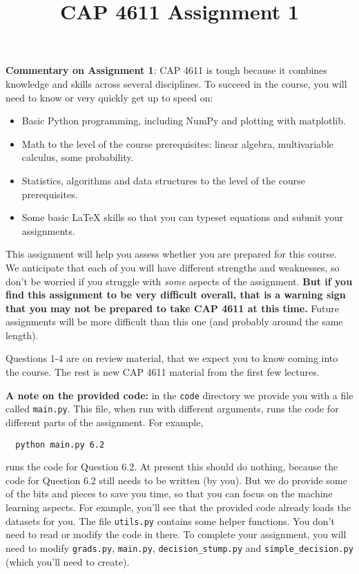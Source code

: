 \documentclass{article}
\begin{document}
  \title{CAP 4611 Assignment 1}

  \date{}
  \maketitle


  \textbf{Commentary on Assignment 1}: CAP 4611 is tough because it combines knowledge and skills across several disciplines. To succeed
  in the course, you will need to know or very quickly get up to speed on:
  \begin{itemize}
  \item Basic Python programming, including NumPy and plotting with matplotlib.
  \item Math to the level of the course prerequisites: linear algebra, multivariable calculus, some probability.
  \item Statistics, algorithms and data structures to the level of the course prerequisites.
  \item Some basic LaTeX skills so that you can typeset equations and submit your assignments.
  \end{itemize}

  This assignment will help you assess whether you are prepared for this course. We anticipate that each
  of you will have different strengths and weaknesses, so don't be worried if you struggle with \emph{some} aspects
  of the assignment. \textbf{But if you find this assignment
  to be very difficult overall, that is a warning sign that you may not be prepared to take CAP 4611
  at this time.} Future assignments will be more difficult than this one (and probably around the same length).

  Questions 1-4 are on review material, that we expect you to know coming into the course. The rest is new CAP 4611 material from the first few lectures.

  \textbf{A note on the provided code:} in the \texttt{code} directory we provide you with a file called
  \texttt{main.py}. This file, when run with different arguments, runs the code for different
  parts of the assignment. For example,
  \begin{verbatim}
  python main.py 6.2
  \end{verbatim}
  runs the code for Question 6.2. At present this should do nothing, because the code
  for Question 6.2 still needs to be written (by you). But we do provide some of the bits
  and pieces to save you time, so that you can focus on the machine learning aspects.
  For example, you'll see that the provided code already loads the datasets for you.
  The file \texttt{utils.py} contains some helper functions.
  You don't need to read or modify the code in there.
  To complete your assignment, you will need to modify \texttt{grads.py}, \texttt{main.py}, \texttt{decision\string_stump.py} and \texttt{simple\string_decision.py} (which you'll need to create).
\end{document}
